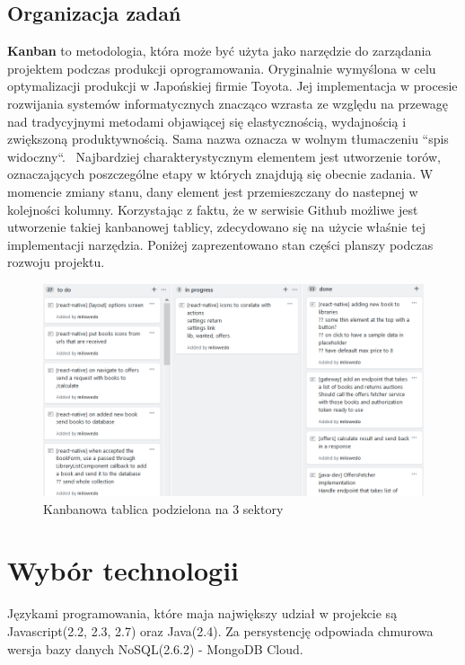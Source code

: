 \subsection{Organizacja zadań}
\textbf{Kanban} to metodologia, która może być użyta jako narzędzie do zarządania projektem podczas produkcji oprogramowania. Oryginalnie wymyślona w celu optymalizacji produkcji w Japońskiej firmie Toyota. Jej implementacja w procesie rozwijania systemów informatycznych znacząco wzrasta ze względu na przewagę nad tradycyjnymi metodami objawiącej się elastycznością, wydajnością i zwiększoną produktywnością. Sama nazwa oznacza w wolnym tłumaczeniu ``spis widoczny``.~\cite{kanban} Najbardziej charakterystycznym elementem jest utworzenie torów, oznaczających poszczególne etapy w których znajdują się obecnie zadania. W momencie zmiany stanu, dany element jest przemieszczany do nastepnej w kolejności kolumny.
Korzystając z faktu, że w serwisie Github możliwe jest utworzenie takiej kanbanowej tablicy, zdecydowano się na użycie właśnie tej implementacji narzędzia. Poniżej zaprezentowano stan części planszy podczas rozwoju projektu.
\begin{figure}[H]
	\centering
	\includegraphics[width=\linewidth]{kanban.png}
	\caption{Kanbanowa tablica podzielona na 3 sektory}
\end{figure}

\newpage
\section{Wybór technologii}
Językami programowania, które maja największy udział w projekcie są Javascript(2.2, 2.3, 2.7) oraz Java(2.4). Za persystencję odpowiada chmurowa wersja bazy danych NoSQL(2.6.2) - MongoDB Cloud.

